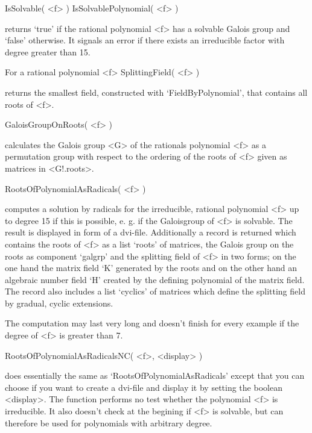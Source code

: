 



\> IsSolvable( <f> )
\> IsSolvablePolynomial( <f> )

returns `true' if the rational polynomial <f> has a solvable Galois group and
`false' otherwise. It signals an error if there exists an irreducible factor
with degree greater than 15.

For a rational polynomial <f>
\> SplittingField( <f> )

returns the smallest field, constructed with `FieldByPolynomial', that
contains all roots of <f>. 

\> GaloisGroupOnRoots( <f> )

calculates the Galois group <G> of the rationals polynomial <f> as a
permutation group with respect to the ordering of the roots of <f> given as
matrices in <G!.roots>.



\> RootsOfPolynomialAsRadicals( <f> )

computes a solution by radicals for the irreducible, rational polynomial <f>
up to degree 15 if this is possible, e. g. if the Galoisgroup of <f> is
solvable. The result is displayed in form of a dvi-file. Additionally a record
is returned which contains the roots of <f> as a list `roots' of matrices, the
Galois group on the roots as component `galgrp'
and the splitting field of <f> in two forms; on the one hand the
matrix field  `K' generated by the roots and on the other hand an algebraic
number field  `H' created by the defining polynomial of the matrix field. The
record also includes a list `cyclics' of matrices which define the splitting
field by gradual, cyclic extensions.

The computation may last very long and doesn't finish for every example if the
degree of <f> is greater than 7.

\> RootsOfPolynomialAsRadicalsNC( <f>, <display> )

does essentially the same as `RootsOfPolynomialAsRadicals' except that you can
choose if you want to create a dvi-file and display it by setting the boolean
<display>. The function performs no test whether the polynomial <f> is
irreducible. It also doesn't check at the begining if <f> is solvable, but can
therefore be used for polynomials with arbitrary degree.







